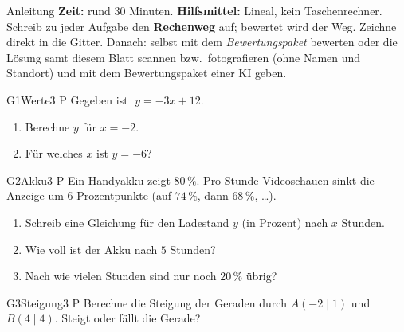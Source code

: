 \documentclass[11pt]{article}
\begin{document}

\begin{lpinfo}{Anleitung}
\textbf{Zeit:} rund 30 Minuten. \textbf{Hilfsmittel:} Lineal, kein Taschenrechner.
Schreib zu jeder Aufgabe den \textbf{Rechenweg} auf; bewertet wird der Weg. Zeichne direkt in die Gitter.
Danach: selbst mit dem \emph{Bewertungspaket} bewerten oder die Lösung samt diesem Blatt scannen bzw.\ fotografieren
(ohne Namen und Standort) und mit dem Bewertungspaket einer KI geben.
\end{lpinfo}


\begin{lpaufgabe}{G1}{Werte}{3 P}
Gegeben ist $\;y = -3x + 12$.
\begin{enumerate}[label=(\alph*),leftmargin=*,itemsep=3pt]
\item Berechne $y$ für $x = -2$.
\item Für welches $x$ ist $y = -6$?
\end{enumerate}
\end{lpaufgabe}

\begin{lpaufgabe}{G2}{Akku}{3 P}
Ein Handyakku zeigt $80\,\%$. Pro Stunde Videoschauen sinkt die Anzeige um $6$ Prozentpunkte (auf $74\,\%$, dann $68\,\%$, \dots).
\begin{enumerate}[label=(\alph*),leftmargin=*,itemsep=3pt]
\item Schreib eine Gleichung für den Ladestand $y$ (in Prozent) nach $x$ Stunden.
\item Wie voll ist der Akku nach $5$ Stunden?
\item Nach wie vielen Stunden sind nur noch $20\,\%$ übrig?
\end{enumerate}
\end{lpaufgabe}


\begin{lpaufgabe}{G3}{Steigung}{3 P}
Berechne die Steigung der Geraden durch $A(-2 \mid 1)$ und $B(4 \mid 4)$. Steigt oder fällt die Gerade?
\end{lpaufgabe}
\end{document}
